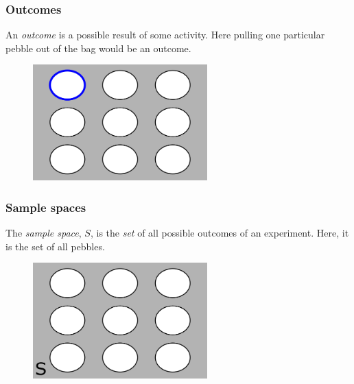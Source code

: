\documentclass{beamer}
\begin{document}
	\begin{frame}
		\frametitle{Outcomes}
		
		An \textit{outcome} is a possible result of some activity. Here pulling one particular pebble out of the bag would be an outcome.
		
		\begin{figure}[ht]
			\centerline{\includegraphics[width=0.6\textwidth]{./figures/pebble_world_single.png}}
		\end{figure}
		
	\end{frame}

	\begin{frame}
		\frametitle{Sample spaces}
		
		The \textit{sample space}, $S$, is the \textit{set} of all possible outcomes of an experiment. Here, it is the set of all pebbles.
		
		\begin{figure}[ht]
			\centerline{\includegraphics[width=0.6\textwidth]{./figures/pebble_world_sample_space.png}}
		\end{figure}
		
	\end{frame}
\end{document}
